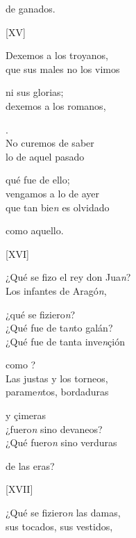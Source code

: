\documentclass[11pt,a4paper,twoside]{article}
\begin{document}
{de ganados.
\pend

\begin{center}
	[XV]
\end{center}
\pstart
Dexemos a los troyanos,\\
que sus males no los vimos

ni sus glorias;\\
dexemos a los romanos,\\

.\\
No curemos de saber\\
lo de aquel  pasado

qué fue de ello;\\
vengamos a lo de ayer\\
que tan bie\textit{n} es olvidado

como aquello.
\pend

\begin{center}
	[XVI]
\end{center}
\pstart
¿Qué se fizo el rey don Jua\textit{n}?\\
Los infantes de Aragó\textit{n},

¿qué se fiziero\textit{n}?\\
¿Qué fue de ta\textit{n}to galán?\\
¿Qué fue de tanta inve\textit{n}çión

como ?\\
Las justas y los torneos,\\
parame\textit{n}tos, bordaduras

y çimeras\\
¿fuero\textit{n} sino devaneos?\\
¿Qué fuero\textit{n} sino verduras

de las eras?
\pend

\begin{center}
	[XVII]
\end{center}
\pstart
¿Qué se fiziero\textit{n} las damas,\\
sus tocados, sus vestidos,

}
\end{document}
